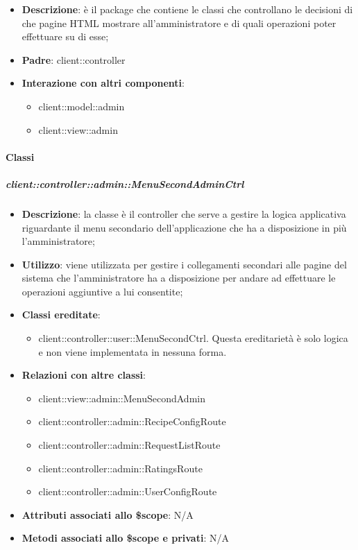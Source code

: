 \begin{itemize}
	\item \textbf{Descrizione}: è il package che contiene le classi che controllano le decisioni di che pagine HTML mostrare all'amministratore e di quali operazioni poter effettuare su di esse;
	\item \textbf{Padre}: client::controller
	\item \textbf{Interazione con altri componenti}:
		\begin{itemize}
			\item client::model::admin
			\item client::view::admin
		\end{itemize}
\end{itemize}

	\paragraph{Classi} %
		\subparagraph{client::controller::admin::MenuSecondAdminCtrl} %
		\label{subp:bdsm_app_client_controller_admin_menusecondadminctrl}

			\begin{itemize}
				\item \textbf{Descrizione}: la classe è il controller che serve a gestire la logica applicativa riguardante il menu secondario dell'applicazione che ha a disposizione in più l'amministratore;
				\item \textbf{Utilizzo}: viene utilizzata per gestire i collegamenti secondari alle pagine del sistema che l'amministratore ha a disposizione per andare ad effettuare le operazioni aggiuntive a lui consentite;
				\item \textbf{Classi ereditate}:
					\begin{itemize}
						\item client::controller::user::MenuSecondCtrl. Questa ereditarietà è solo logica e non viene implementata in nessuna forma.
					\end{itemize}
				\item \textbf{Relazioni con altre classi}:
					\begin{itemize}
						\item client::view::admin::MenuSecondAdmin
						\item client::controller::admin::RecipeConfigRoute
						\item client::controller::admin::RequestListRoute
						\item client::controller::admin::RatingsRoute
						\item client::controller::admin::UserConfigRoute
					\end{itemize}
				\item \textbf{Attributi associati allo \$scope}: N/A
				\item \textbf{Metodi associati allo \$scope e privati}: N/A
			\end{itemize}

